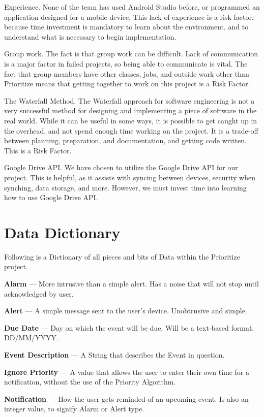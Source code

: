 \documentclass[12pt]{article}
\begin{document}
Experience. None of the team has used Android Studio before, or programmed an application designed for a mobile device. This lack of experience is a risk factor, because time investment is mandatory to learn about the environment, and to understand what is necessary to begin implementation.

Group work. The fact is that group work can be difficult. Lack of communication is a major factor in failed projects, so being able to communicate is vital. The fact that group members have other classes, jobs, and outside work other than Prioritize means that getting together to work on this project is a Risk Factor. 

The Waterfall Method. The Waterfall approach for software engineering is not a very successful method for designing and implementing a piece of software in the real world. While it can be useful in some ways, it is possible to get caught up in the overhead, and not spend enough time working on the project. It is a trade-off between planning, preparation, and documentation, and getting code written. This is a Risk Factor.

Google Drive API. We have chosen to utilize the Google Drive API for our project. This is helpful, as it assists with syncing between devices, security when synching, data storage, and more. However, we must invest time into learning how to use Google Drive API. 


\section{Data Dictionary}\label{Data Dictionary}
Following is a Dictionary of all pieces and bits of Data within the Prioritize project.

\textbf{Alarm} --- More intrusive than a simple alert. Has a noise that will not stop until acknowledged by user.

\textbf{Alert} --- A simple message sent to the user's device. Unobtrusive and simple.

\textbf{Due Date} --- Day on which the event will be due. Will be a text-based format. DD/MM/YYYY.

\textbf{Event Description} --- A String that describes the Event in question.

\textbf{Ignore Priority} --- A value that allows the user to enter their own time for a notification, without the use of the Priority Algorithm.

\textbf{Notification} --- How the user gets reminded of an upcoming event. Is also an integer value, to signify Alarm or Alert type.
\end{document}
